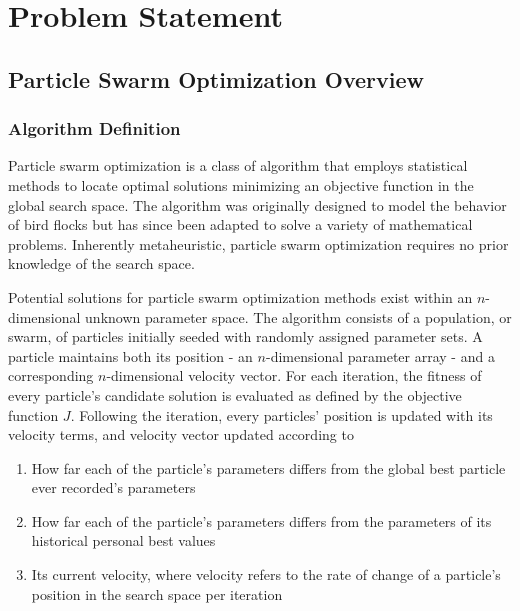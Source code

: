 \chapter{Problem Statement}

\section{Particle Swarm Optimization Overview}

\subsection{Algorithm Definition}
\noindent Particle swarm optimization is a class of algorithm that employs statistical methods to locate optimal solutions 
minimizing an objective function in the global search space. The algorithm was originally designed to model
the behavior of bird flocks but has since been adapted to solve a variety of mathematical problems.
Inherently metaheuristic, particle swarm optimization requires no
prior knowledge of the search space. \newline

\noindent Potential solutions for particle swarm optimization methods exist within an $n$-dimensional unknown parameter space.
The algorithm consists of a population, or swarm, of particles initially seeded with randomly assigned parameter sets.
A particle maintains both its position - an $n$-dimensional parameter array - and a corresponding $n$-dimensional velocity vector.
For each iteration, the fitness of every particle's candidate solution is evaluated as defined by the objective function $J$. 
Following the iteration, every particles' position is updated with its velocity terms,
and velocity vector updated according to
\begin{enumerate}
    \item How far each of the particle's parameters differs from the global best particle ever recorded's parameters
    \item How far each of the particle's parameters differs from the parameters of its historical personal best values
    \item Its current velocity, where velocity refers to the rate of change of a particle's position in the search space per iteration
\end{enumerate}

